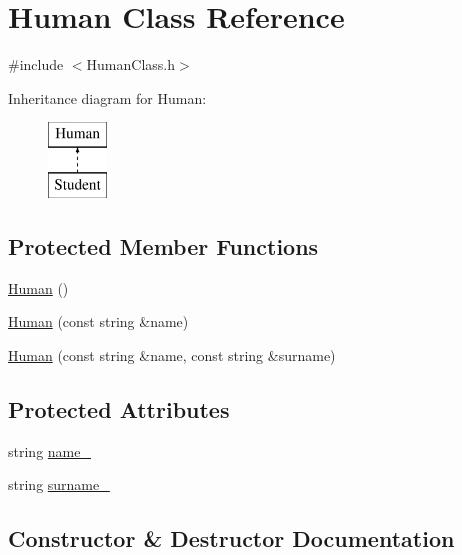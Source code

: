 \hypertarget{class_human}{}\section{Human Class Reference}
\label{class_human}


{\ttfamily \#include $<$Human\+Class.\+h$>$}

Inheritance diagram for Human\+:\begin{figure}[H]
\begin{center}
\leavevmode
\includegraphics[height=2.000000cm]{class_human}
\end{center}
\end{figure}
\subsection*{Protected Member Functions}
\begin{DoxyCompactItemize}
\item 
\mbox{\hyperlink{class_human_a4f84fcddcedd434023a001eba00a095c}{Human}} ()
\item 
\mbox{\hyperlink{class_human_abfd57b90d90f9222384c76b44346ba7b}{Human}} (const string \&name)
\item 
\mbox{\hyperlink{class_human_a87baec7c1de5375cb7e0f15050d855d3}{Human}} (const string \&name, const string \&surname)
\end{DoxyCompactItemize}
\subsection*{Protected Attributes}
\begin{DoxyCompactItemize}
\item 
string \mbox{\hyperlink{class_human_aae88b7b47fcb48ae282483b89b753927}{name\+\_\+}}
\item 
string \mbox{\hyperlink{class_human_aa6632ccd30ebfa087e0d875b2d50340c}{surname\+\_\+}}
\end{DoxyCompactItemize}


\subsection{Constructor \& Destructor Documentation}
\mbox{\label{class_human_a4f84fcddcedd434023a001eba00a095c}} 
